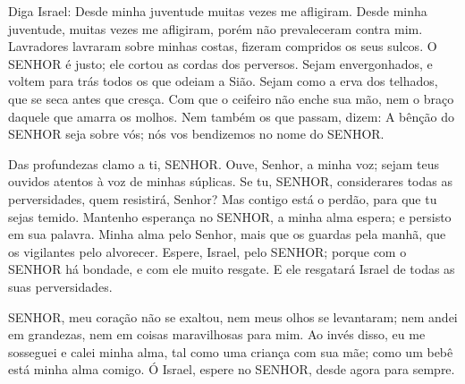 
{\PP 
  Diga Israel: Desde minha juventude muitas vezes me afligiram.
  Desde minha juventude, muitas vezes me afligiram, porém não prevaleceram contra mim.
  Lavradores lavraram sobre minhas costas, fizeram compridos os seus sulcos.
  O SENHOR é justo; ele cortou as cordas dos perversos.
  Sejam envergonhados, e voltem para trás todos os que odeiam a Sião.
  Sejam como a erva dos telhados, que se seca antes que cresça.
  Com que o ceifeiro não enche sua mão, nem o braço daquele que amarra os molhos.
  Nem também os que passam, dizem: A bênção do SENHOR seja sobre vós; nós vos bendizemos no nome do SENHOR.
\par }


{\PP 
  Das profundezas clamo a ti, SENHOR.
  Ouve, Senhor, a minha voz; sejam teus ouvidos atentos à voz de minhas súplicas.
  Se tu, SENHOR, considerares todas as perversidades, quem resistirá, Senhor?
  Mas contigo está o perdão, para que tu sejas temido.
  Mantenho esperança no SENHOR, a minha alma espera; e persisto em sua palavra.
  Minha alma
{} pelo Senhor, mais que os guardas
{} pela manhã,
{} que os vigilantes pelo alvorecer.
  Espere, Israel, pelo SENHOR; porque com o SENHOR há bondade, e com ele muito resgate.
  E ele resgatará Israel de todas as suas perversidades.
\par }


{\PP 
  SENHOR, meu coração não se exaltou, nem meus olhos se levantaram; nem andei em grandezas, nem em coisas maravilhosas para mim.
  Ao invés disso, eu me sosseguei e calei minha alma, tal como uma criança com sua mãe; como um bebê está minha alma comigo.
  Ó Israel, espere no SENHOR, desde agora para sempre.
\par }


